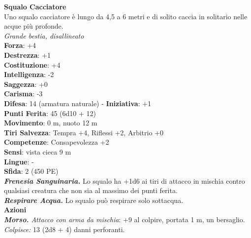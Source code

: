 \begin{multicols}{2}
\medskip\textbf{Squalo Cacciatore}\\
Uno squalo cacciatore è lungo da 4,5 a 6 metri e di solito caccia in solitario nelle acque più profonde.\\
\emph{Grande bestia, disallineato}\\
\textbf{Forza}: +4\\
\textbf{Destrezza}: +1\\
\textbf{Costituzione}: +4\\
\textbf{Intelligenza}: -2\\
\textbf{Saggezza}: +0\\
\textbf{Carisma}: -3\\
\textbf{Difesa}: 14 (armatura naturale) - \textbf{Iniziativa}: +1\\
\textbf{Punti Ferita}: 45 (6d10 + 12)\\
\textbf{Movimento}: 0 m, nuoto 12 m\\
\textbf{Tiri Salvezza}: Tempra +4, Riflessi +2, Arbitrio +0\\
\textbf{Competenze}: Consapevolezza +2\\
\textbf{Sensi}: vista cieca 9 m\\
\textbf{Lingue}: -\\
\textbf{Sfida}: 2 (450 PE)\smallskip\\
\emph{\textbf{Frenesia Sanguinaria.}} Lo squalo ha +1d6 ai tiri di attacco in mischia contro qualsiasi creatura che non sia al massimo dei punti ferita.\\
\emph{\textbf{Respirare Acqua.}} Lo squalo può respirare solo sottacqua.\\
\smallskip\textbf{Azioni}\\
\emph{\textbf{Morso.} Attacco con arma da mischia}: +9 al colpire, portata 1 m, un bersaglio.\\
\emph{Colpisce:} 13 (2d8 + 4) danni perforanti.\\


\end{multicols}
